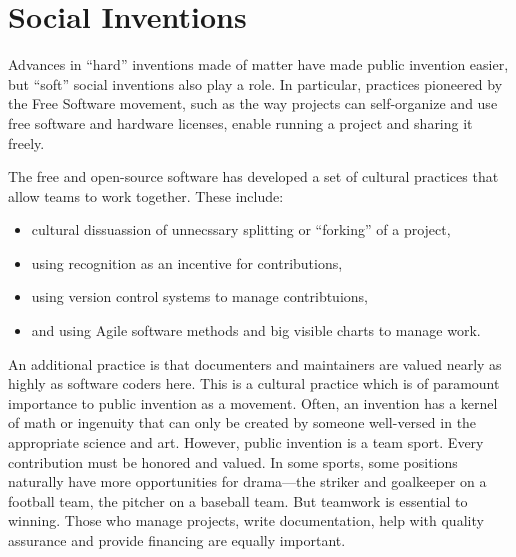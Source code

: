 \documentclass[
	fontsize=10pt, %
	twoside=false, %
	secnumdepth=1, %
]{kaobook}
\begin{document}
\chapter{Social Inventions}

Advances in ``hard'' inventions made of matter
have made public invention easier,
but ``soft'' social inventions also play a role.
In particular, practices pioneered by the Free Software movement,
such as the way projects can self-organize and use
free software and hardware licenses, enable running a
project and sharing it freely.

The free and open-source software has developed a set of cultural
practices that allow teams to work together.  These include:
\begin{itemize}
\item cultural dissuassion of unnecssary splitting or ``forking'' of a
  project,
\item using recognition as an incentive for contributions,
\item using version control systems to manage contribtuions,
\item and using Agile software methods and big visible charts to
  manage work.
\end{itemize}

An additional practice is that documenters and maintainers
are valued nearly as highly as software coders here.
This is a cultural practice which is of paramount importance
to public invention as a movement.
Often, an invention has a kernel of math or ingenuity
that can only be created by someone well-versed in the
appropriate science and art.
However, public invention is a team sport.
Every contribution must be honored and valued.
In some sports, some positions naturally have more
opportunities for drama---the striker and goalkeeper on a football team,
the pitcher on a baseball team.
But teamwork is essential to winning.
Those who manage projects, write documentation,
help with quality assurance and provide financing are
equally important.
\end{document}
